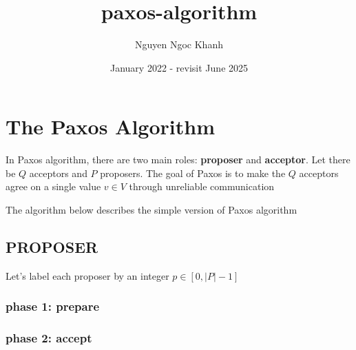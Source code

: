 \documentclass{article}
\title{paxos-algorithm}
\author{Nguyen Ngoc Khanh}
\date{January 2022 - revisit June 2025}
\begin{document}
\maketitle

\section{The Paxos Algorithm}

In Paxos algorithm, there are two main roles: \textbf{proposer} and \textbf{acceptor}. Let there be $Q$ acceptors and $P$ proposers. The goal of Paxos is to make the $Q$ acceptors agree on a single value $v \in V$ through unreliable communication

The algorithm below describes the simple version of Paxos algorithm 
    
\subsection{PROPOSER}
    
Let's label each proposer by an integer $p \in [0, |P|-1]$
\label{algorithm:proposer}
    
\subsubsection{phase 1: prepare}\label{algorithm:proposer:prepare}
    
    
\subsubsection{phase 2: accept}\label{algorithm:proposer:accept}
    
\end{document}
